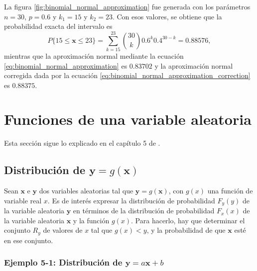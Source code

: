 \documentclass[a4paper]{report}
\newcommand{\x}{\mathbf{x}}
\newcommand{\y}{\mathbf{y}}
\begin{document}
La figura \ref{fig:binomial_normal_approximation} fue generada con los parámetros \(n=30\), \(p=0.6\) y \(k_1=15\) y \(k_2=23\). Con esos valores, se obtiene que la probabilidad exacta del intervalo es
\[
 P\{15\leq\x\leq 23\}=\sum_{k=15}^{23}\binom{30}{k}0.6^k0.4^{30-k}=0.88576,
\]
mientras que la aproximación normal mediante la ecuación \ref{eq:binomial_normal_approximation} es \(0.83702\) y la aproximación normal corregida dada por la ecuación \ref{eq:binomial_normal_approximation_correction} es \(0.88375\).

\chapter{Funciones de una variable aleatoria}

Esta sección sigue lo explicado en el capítulo 5 de \cite{papoulis2002probability}.

\section{\texorpdfstring{Distribución de \(\y=g(\x)\)}{}}

Sean \(\x\) e \(\y\) dos variables aleatorias tal que \(\y=g(\x)\), con \(g(x)\) una función de variable real \(x\). Es de interés expresar la distribución de probabilidad \(F_y(y)\) de la variable aleatoria \(\y\) en términos de la distribución de probabilidad \(F_x(x)\) de la variable aleatoria \(\x\) y la función \(g(x)\). Para hacerlo, hay que determinar el conjunto \(R_y\) de valores de \(x\) tal que \(g(x)<y\), y la probabilidad de que \(\x\) esté en ese conjunto.

\subsection{\texorpdfstring{Ejemplo 5-1: Distribución de \(\y=a\x+b\)}{}}\label{sec:y_equals_ax_plus_b_distribution}
\end{document}

